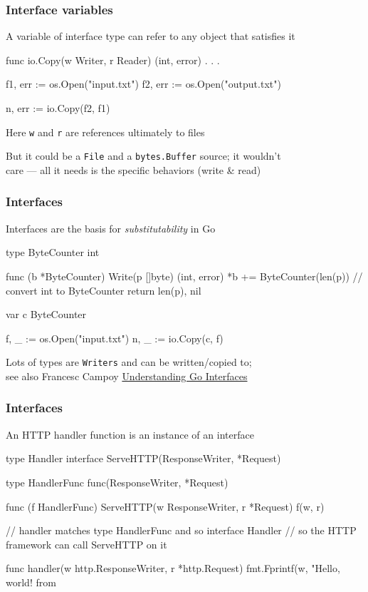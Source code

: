 \documentclass[handout,compress,t,11pt]{beamer}
\begin{document}
\begin{frame}[fragile]
    \frametitle{Interface variables}
    A variable of interface type can refer to any object that satisfies it \par
    \vspace{0.4\baselineskip}
\begin{golang}
func io.Copy(w Writer, r Reader) (int, error) {
    . . .
}

f1, err := os.Open("input.txt")
f2, err := os.Open("output.txt")

n, err := io.Copy(f2, f1)
\end{golang}
    \vspace{0.6\baselineskip}
    Here \verb|w| and \verb|r| are references ultimately to files \par
    \vspace{0.4\baselineskip}
    But it could be a \verb|File| and a \verb|bytes.Buffer| source;
    it wouldn't\\
     care --- all it needs is the specific behaviors (write \& read)
\end{frame}

\begin{frame}[fragile]
    \frametitle{Interfaces}
    Interfaces are the basis for {\em substitutability} in Go \par
    \vspace{0.4\baselineskip}
\begin{golang}
type ByteCounter int

func (b *ByteCounter) Write(p []byte) (int, error) {
    *b += ByteCounter(len(p)) // convert int to ByteCounter
    return len(p), nil
}

var c ByteCounter

f, _ := os.Open("input.txt")
n, _ := io.Copy(c, f)
\end{golang}
    \vspace{\baselineskip}
    Lots of types are \verb|Writers| and can be written/copied to; \\
    see also Francesc Campoy \href{https://www.youtube.com/watch?v=F4wUrj6pmSI}%
    {Understanding Go Interfaces}
\end{frame}


\begin{frame}[fragile]
    \frametitle{Interfaces}
    An HTTP handler function is an instance of an interface
\begin{golang}
type Handler interface {
	ServeHTTP(ResponseWriter, *Request)
}
    
type HandlerFunc func(ResponseWriter, *Request)

func (f HandlerFunc) ServeHTTP(w ResponseWriter, r *Request) {
    f(w, r)
}

// handler matches type HandlerFunc and so interface Handler
// so the HTTP framework can call ServeHTTP on it

func handler(w http.ResponseWriter, r *http.Request) {
    fmt.Fprintf(w, "Hello, world! from %
}
\end{golang}
\end{frame}
\end{document}

